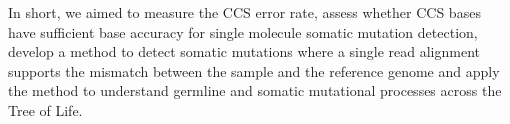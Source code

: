In short, we aimed to measure the CCS error rate, assess whether CCS bases have sufficient base accuracy for single molecule somatic mutation detection, develop a method to detect somatic mutations where a single read alignment supports the mismatch between the sample and the reference genome and apply the method to understand germline and somatic mutational processes across the Tree of Life. 








